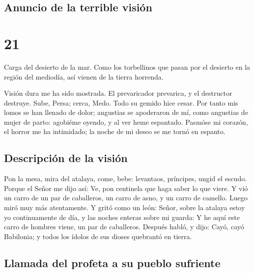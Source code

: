 \hypertarget{anuncio-de-la-terrible-visiuxf3n}{%
\subsection{Anuncio de la terrible
visión}\label{anuncio-de-la-terrible-visiuxf3n}}

\hypertarget{section-20}{%
\section{21}\label{section-20}}

 Carga del desierto de la mar. Como los torbellinos que
pasan por el desierto en la región del mediodía, así vienen de la tierra
horrenda.

 Visión dura me ha sido mostrada. El prevaricador
prevarica, y el destructor destruye. Sube, Persa; cerca, Medo. Todo su
gemido hice cesar.  Por tanto mis lomos se han llenado de
dolor; angustias se apoderaron de mí, como angustias de mujer de parto:
agobiéme oyendo, y al ver heme espantado.  Pasmóse mi
corazón, el horror me ha intimidado; la noche de mi deseo se me tornó en
espanto.

\hypertarget{descripciuxf3n-de-la-visiuxf3n}{%
\subsection{Descripción de la
visión}\label{descripciuxf3n-de-la-visiuxf3n}}

 Pon la mesa, mira del atalaya, come, bebe: levantaos,
príncipes, ungid el escudo.  Porque el Señor me dijo así:
Ve, pon centinela que haga saber lo que viere.  Y vió un
carro de un par de caballeros, un carro de asno, y un carro de camello.
Luego miró muy más atentamente.  Y gritó como un león:
Señor, sobre la atalaya estoy yo continuamente de día, y las noches
enteras sobre mi guarda:  Y he aquí este carro de hombres
viene, un par de caballeros. Después habló, y dijo: Cayó, cayó
Babilonia; y todos los ídolos de sus dioses quebrantó en tierra.

\hypertarget{llamada-del-profeta-a-su-pueblo-sufriente}{%
\subsection{Llamada del profeta a su pueblo
sufriente}\label{llamada-del-profeta-a-su-pueblo-sufriente}}

